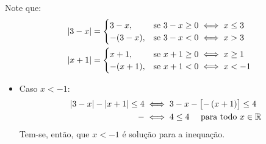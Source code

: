 \begin{solution}
Note que:
%
\begin{align*}
	& \left|3-x\right|= 
	\begin{cases}
		3-x,    & \text{se } 3-x \ge 0 \iff x \le 3 \\
		-(3-x), & \text{se } 3-x < 0 \iff x > 3
	\end{cases}\\
	& \left|x+1\right|= 
	\begin{cases}
		x+1,    & \text{se } x+1 \ge 0 \iff x \ge 1 \\
		-(x+1), & \text{se } x+1 < 0 \iff x < -1
	\end{cases}
\end{align*}

\begin{itemize}
	\item Caso $x<-1$:
	\begin{align*}
		\left|3-x\right|-\left|x+1\right|\le4 & \iff 3-x-\left[-\left(x+1\right)\right]\le 4\\
			-					  & \iff 4 \le 4 \ \ \ \ \text{para todo } x \in \mathbb{R}
	\end{align*}
	Tem-se, então, que $x<-1$ é solução para a inequação.
\end{itemize}

\end{solution}